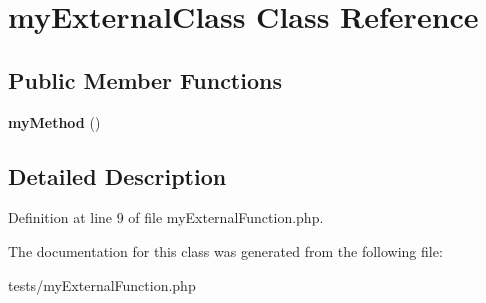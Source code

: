 \hypertarget{classmyExternalClass}{
\section{myExternalClass Class Reference}
\label{classmyExternalClass}
}
\subsection*{Public Member Functions}
\begin{DoxyCompactItemize}
\item 
\hypertarget{classmyExternalClass_a3c141676f7ea285139042cdfaebf6194}{
{\bfseries myMethod} ()}
\label{classmyExternalClass_a3c141676f7ea285139042cdfaebf6194}

\end{DoxyCompactItemize}


\subsection{Detailed Description}


Definition at line 9 of file myExternalFunction.php.



The documentation for this class was generated from the following file:\begin{DoxyCompactItemize}
\item 
tests/myExternalFunction.php\end{DoxyCompactItemize}
